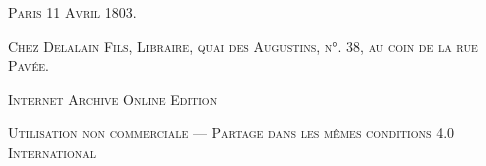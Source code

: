\documentclass[a4paper, 11pt, oneside, polutonikogreek, french]{article}
\begin{document}
\begin{titlepage}
	\vspace{1\baselineskip}

	{\small\scshape Paris 11 Avril 1803.}
	
	{\small\scshape{Chez Delalain Fils, Libraire, quai des Augustins, n°. 38, au coin de la rue Pavée.}}
	
	\vspace{0.5\baselineskip} %

        \scshape Internet Archive Online Edition  %
	
	{\scshape\small Utilisation non commerciale --- Partage dans les mêmes conditions 4.0 International} %
\end{titlepage}
\setlength{\parskip}{1mm plus1mm minus1mm}
\clearpage
\paragraph{}

\clearpage
\end{document}
